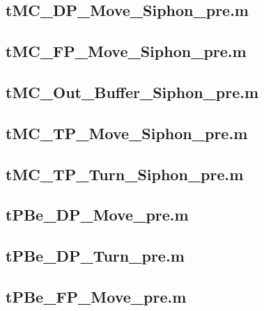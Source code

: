 \documentclass[runningheads,a4paper]{llncs}
\newcommand{\GPenSIM}{../GPenSIM}
\begin{document}
\subsection{tMC\_DP\_Move\_Siphon\_pre.m}
\label{app:tMC_DP_Move_Siphon_pre}


\subsection{tMC\_FP\_Move\_Siphon\_pre.m}
\label{app:tMC_FP_Move_Siphon_pre}


\subsection{tMC\_Out\_Buffer\_Siphon\_pre.m}
\label{app:tMC_Out_Buffer_Siphon_pre}


\subsection{tMC\_TP\_Move\_Siphon\_pre.m}
\label{app:tMC_TP_Move_Siphon_pre}


\subsection{tMC\_TP\_Turn\_Siphon\_pre.m}
\label{app:tMC_TP_Turn_Siphon_pre}


\subsection{tPBe\_DP\_Move\_pre.m}
\label{app:tPBe_DP_Move_pre}


\subsection{tPBe\_DP\_Turn\_pre.m}
\label{app:tPBe_DP_Turn_pre}


\subsection{tPBe\_FP\_Move\_pre.m}
\label{app:tPBe_FP_Move_pre}

\end{document}
